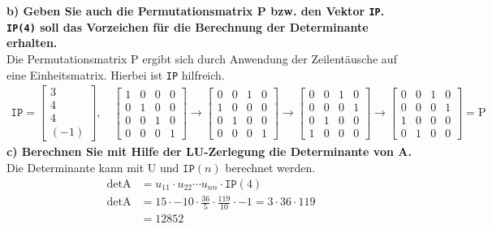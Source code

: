\documentclass[10pt,a4paper]{article}
\begin{document}
	\textbf{%
		b) Geben Sie auch die Permutationsmatrix P bzw. den Vektor \texttt{IP}. \texttt{IP(4)} soll das Vorzeichen für die Berechnung der Determinante erhalten.
	}\\
	Die Permutationsmatrix P ergibt sich durch Anwendung der Zeilentäusche auf eine Einheitsmatrix. Hierbei ist \texttt{IP} hilfreich.
	\begin{align*}
		\texttt{IP}=
		\begin{bmatrix}
			3 \\
			4 \\
			4 \\
			(-1)
		\end{bmatrix}
		, \quad
		\begin{bmatrix}
			1 & 0 & 0 & 0 \\
			0 & 1 & 0 & 0 \\
			0 & 0 & 1 & 0 \\
			0 & 0 & 0 & 1
		\end{bmatrix}
		\rightarrow
		\begin{bmatrix}
			0 & 0 & 1 & 0 \\
			1 & 0 & 0 & 0 \\
			0 & 1 & 0 & 0 \\
			0 & 0 & 0 & 1
		\end{bmatrix}
		\rightarrow
		\begin{bmatrix}
			0 & 0 & 1 & 0 \\
			0 & 0 & 0 & 1 \\
			0 & 1 & 0 & 0 \\
			1 & 0 & 0 & 0
		\end{bmatrix}
		\rightarrow
		\begin{bmatrix}
			0 & 0 & 1 & 0 \\
			0 & 0 & 0 & 1 \\
			1 & 0 & 0 & 0 \\
			0 & 1 & 0 & 0
		\end{bmatrix}
		= \text{P}
	\end{align*}
	\textbf{%
		c) Berechnen Sie mit Hilfe der LU-Zerlegung die Determinante von A.
	}\\
	Die Determinante kann mit U und $\texttt{IP}(n)$ berechnet werden.
	\begin{align*}\tag{5.38, S. 121}
		\det \text{A}& = u_{11}\cdot u_{22}\cdots u_{nn}\cdot\texttt{IP}(4) \\
		\det \text{A}& = 15\cdot -10 \cdot \frac{36}{5} \cdot \frac{119}{10} \cdot -1 =
			3\cdot  36 \cdot 119\\
			& = 12852
	\end{align*}
	
\end{document}
